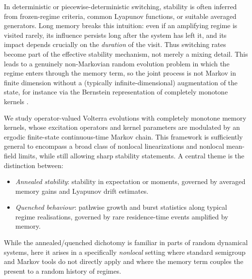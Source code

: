 \documentclass[12pt,a4paper]{article}
\theoremstyle{plain}
\theoremstyle{definition}
\theoremstyle{remark}
\begin{document}
	In deterministic or piecewise-deterministic switching, stability is often inferred from frozen-regime criteria, common Lyapunov
	functions, or suitable averaged generators.
	Long memory breaks this intuition: even if an amplifying regime is visited rarely, its influence persists long after the system has
	left it, and its impact depends crucially on the \emph{duration} of the visit.
	Thus switching rates become part of the effective stability mechanism, not merely a mixing detail.
	This leads to a genuinely non-Markovian random evolution problem in which the regime enters through the memory term, so the joint
	process is not Markov in finite dimension without a (typically infinite-dimensional) augmentation of the state, for instance via the
	Bernstein representation of completely monotone kernels \cite{pruss1993evolution,bazhlekova2000fractional}.
	
	We study operator-valued Volterra evolutions with completely monotone memory kernels, whose excitation operators and kernel
	parameters are modulated by an ergodic finite-state continuous-time Markov chain.
	This framework is sufficiently general to encompass a broad class of nonlocal linearizations and nonlocal mean-field limits, while
	still allowing sharp stability statements.
	A central theme is the distinction between:
	\begin{itemize}
		\item \emph{Annealed stability}: stability in expectation or moments, governed by averaged memory gains and Lyapunov drift estimates.
		\item \emph{Quenched behaviour}: pathwise growth and burst statistics along typical regime realisations, governed by rare residence-time
		events amplified by memory.
	\end{itemize}
	While the annealed/quenched dichotomy is familiar in parts of random dynamical systems, here it arises in a specifically \emph{nonlocal}
	setting where standard semigroup and Markov tools do not directly apply and where the memory term couples the present to a random
	history of regimes.
	
\end{document}
